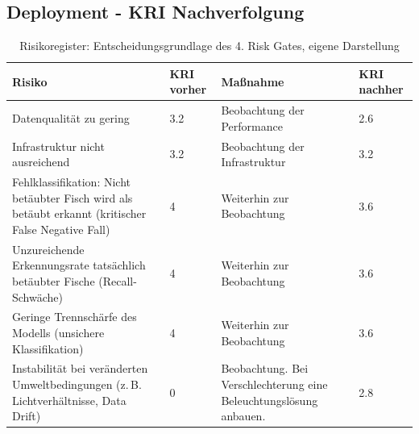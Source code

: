 \subsection{Deployment - KRI Nachverfolgung}
\label{appendix:cs3_phase4_risiko_verfolgung}
\begin{table}[H]
    \label{tab:cs3_phase4_risiko_verfolgung_tabelle}
    \centering
    \renewcommand{\arraystretch}{1.3}
    \begin{tabular}{|p{3cm}|p{3cm}|p{3cm}|p{3cm}|}
    \hline
    \textbf{Risiko} & \textbf{KRI vorher} & \textbf{Maßnahme} & \textbf{KRI nachher} \\
    \hline

    Datenqualität zu gering
    & 3.2
    & Beobachtung der Performance
    & 2.6 \\
    \hline

    Infrastruktur nicht ausreichend 
    & 3.2
    & Beobachtung der Infrastruktur
    & 3.2 \\
    \hline

    Fehlklassifikation: Nicht betäubter Fisch wird als betäubt erkannt (kritischer False Negative Fall) 
    & 4
    & Weiterhin zur Beobachtung
    & 3.6  \\
    \hline

    Unzureichende Erkennungsrate tatsächlich betäubter Fische (Recall-Schwäche)
    & 4
    & Weiterhin zur Beobachtung
    & 3.6  \\
    \hline

    Geringe Trennschärfe des Modells (unsichere Klassifikation)
    & 4
    & Weiterhin zur Beobachtung
    & 3.6  \\
    \hline

    Instabilität bei veränderten Umweltbedingungen (z.\,B. Lichtverhältnisse, Data Drift)
    & 0
    & Beobachtung. Bei Verschlechterung eine Beleuchtungslösung anbauen.
    & 2.8 \\
    \hline

    \end{tabular}
    \caption{Risikoregister: Entscheidungsgrundlage des 4. Risk Gates, eigene Darstellung}
\end{table}

